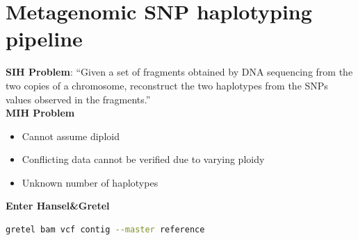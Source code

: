\documentclass{beamer}
\begin{document}
\section{Metagenomic SNP haplotyping pipeline}

\begin{frame}[fragile]
	\textbf{SIH Problem}: ``Given a set of fragments obtained by DNA sequencing from the two copies of a chromosome, reconstruct the two haplotypes from the SNPs values observed in the fragments.''\cite{lanciaSNPsProblemsComplexity2001} \\
	\textbf{MIH Problem}
	\begin{itemize}
		\item Cannot assume diploid
		\item Conflicting data cannot be verified due to varying ploidy
		\item Unknown number of haplotypes
	\end{itemize}
	\textbf{Enter Hansel\&Gretel}
	\begin{lstlisting}[language=bash]
gretel bam vcf contig --master reference
	\end{lstlisting}
	
\end{frame}
\end{document}
